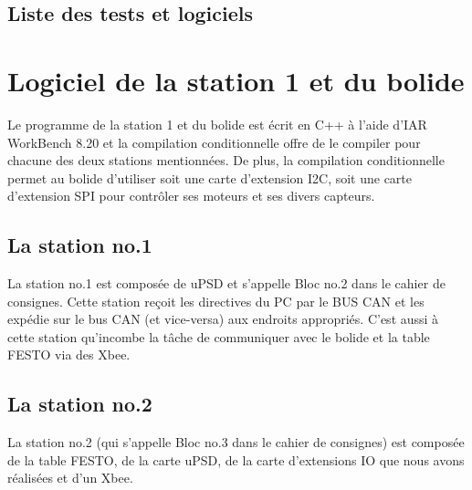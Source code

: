 \documentclass[10pt,a4paper,final]{article}
\begin{document}
\begin{spacing}{1.5}
\subsection{Liste des tests et logiciels}






\pagebreak
\section{Logiciel de la station 1 et du bolide}
Le programme de la station 1 et du bolide est écrit en C++ à l'aide d'IAR WorkBench 8.20 et la compilation conditionnelle offre de le compiler pour chacune des deux stations mentionnées. De plus, la compilation conditionnelle permet au bolide d'utiliser soit une carte d'extension I2C, soit une carte d'extension SPI pour contrôler ses moteurs et ses divers capteurs.

\subsection{La station no.1}
La station no.1 est composée de uPSD et s'appelle Bloc no.2 dans le cahier de consignes. Cette station reçoit les directives du PC par le BUS CAN et les expédie sur le bus CAN (et vice-versa) aux endroits appropriés. C'est aussi à cette station qu'incombe la tâche de communiquer avec le bolide et la table FESTO via des Xbee.

\subsection{La station no.2}
La station no.2 (qui s'appelle Bloc no.3 dans le cahier de consignes) est composée de la table FESTO, de la carte uPSD, de la carte d'extensions IO que nous avons réalisées et d'un Xbee.
\pagebreak

\begin{figure}[hbtp]

\end{figure}
\end{spacing}
\end{document}
